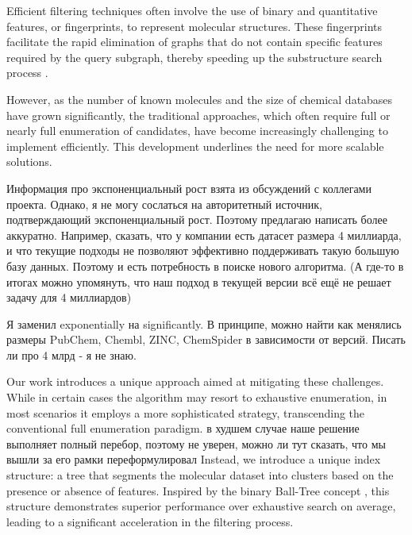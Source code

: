 Efficient filtering techniques often involve the use of binary and quantitative features, or fingerprints, to represent molecular 
structures. These fingerprints facilitate the rapid elimination of graphs that do not contain specific features required by the 
query subgraph, thereby speeding up the substructure search process \cite{bonchi2011, klein2014}.

However, as the number of known molecules and the size of chemical databases have grown significantly, the traditional approaches, 
which often require full or nearly full enumeration of candidates, have become increasingly challenging to implement efficiently. 
This development underlines the need for more scalable solutions.

{\color{red} Информация про экспоненциальный рост взята из обсуждений с коллегами проекта. Однако, я не могу сослаться на авторитетный источник, подтверждающий экспоненциальный рост. Поэтому предлагаю написать более аккуратно. Например, сказать, что у компании есть датасет размера 4 миллиарда, и что текущие подходы не позволяют эффективно поддерживать такую большую базу данных. Поэтому и есть потребность в поиске нового алгоритма. (А где-то в итогах можно упомянуть, что наш подход в текущей версии всё ещё не решает задачу для 4 миллиардов) }

{\color{blue} Я заменил exponentially на significantly. В принципе, можно найти как менялись размеры PubChem, Chembl, ZINC, ChemSpider в зависимости от версий. Писать ли про 4 млрд - я не знаю.}

Our work introduces a unique approach aimed at mitigating these challenges. While in certain cases the algorithm may resort to exhaustive enumeration, in most scenarios it employs a more sophisticated strategy, transcending the conventional full enumeration paradigm.
{\color{red} в худшем случае наше решение выполняет полный перебор, поэтому не уверен, можно ли тут сказать, что мы вышли за его рамки}
{\color{blue} переформулировал}
Instead, we introduce a unique index structure: a tree that segments the molecular dataset into clusters based on the presence or 
absence of features. Inspired by the binary Ball-Tree concept \cite{omohundro1989, clarkson1994}, this structure demonstrates 
superior performance over exhaustive search on average, leading to a significant acceleration in the filtering process.

